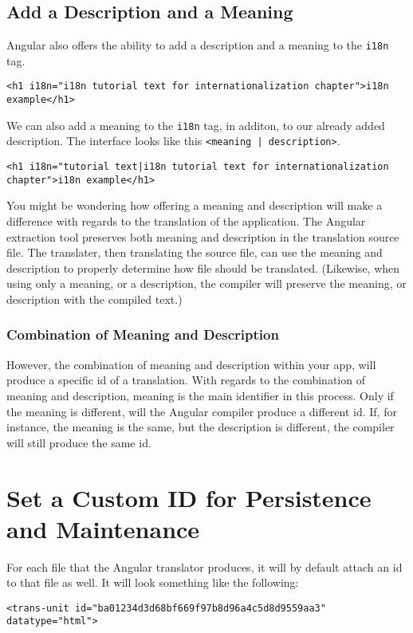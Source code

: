 
\subsection{Add a Description and a Meaning}
Angular also offers the ability to add a description and a meaning to the
\lstinline{i18n} tag. 
\begin{lstlisting}[caption=i18n description]
<h1 i18n="i18n tutorial text for internationalization chapter">i18n example</h1>
\end{lstlisting}

We can also add a meaning to the \lstinline{i18n} tag, in additon, to our 
already added description. The interface looks like this 
\lstinline{<meaning | description>}.

\begin{lstlisting}[caption=i18n \lstinline{<meaning | description>} Example]
<h1 i18n="tutorial text|i18n tutorial text for internationalization chapter">i18n example</h1>
\end{lstlisting}

You might be wondering how offering a meaning and description will make a 
difference with regards to the translation of the application. The Angular 
extraction tool preserves both meaning and description in the translation 
source file. The translater, then translating the source file, can use 
the meaning and description to properly determine how file should be 
translated. (Likewise, when using only a meaning, or a description, the 
compiler will preserve the meaning, or description with the compiled text.)

\subsubsection{Combination of Meaning and Description}
However, the combination of meaning and description within your app, will produce 
a specific id of a translation. With regards to the combination of meaning and 
description, meaning is the main identifier in this process. Only if the meaning 
is different, will the Angular compiler produce a different id. If, for instance, 
the meaning is the same, but the description is different, the compiler will 
still produce the same id. 

\section{Set a Custom ID for Persistence and Maintenance}
For each file that the Angular translator produces, it will by default attach 
an id to that file as well. It will look something like the following: 
\begin{lstlisting}[caption=example.fr.xlf.html]
<trans-unit id="ba01234d3d68bf669f97b8d96a4c5d8d9559aa3" datatype="html">
\end{lstlisting}


